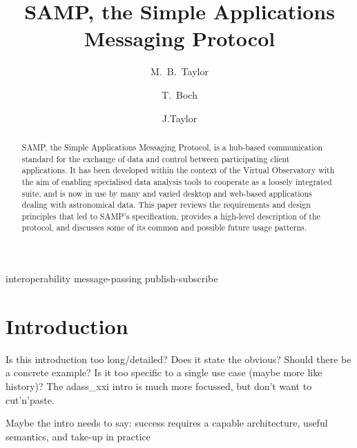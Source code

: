 \documentclass[5p]{elsarticle}
\newcommand{\todo}{\color{gray}}
\begin{document}
\begin{frontmatter}

\title{SAMP, the Simple Applications Messaging Protocol}

\author[bristol]{M.~B.~Taylor}
\author[cds]{T.~Boch}
\author[google]{J.Taylor}

\address[bristol]{H.~H.~Wills Physics Laboratory, University of Bristol, UK}
\address[cds]{CDS, Observatoire Astronomique de Strasbourg, France}
\address[google]{Google, USA}

\begin{abstract}
SAMP, the Simple Applications Messaging Protocol, is a
hub-based communication standard for the exchange of data and control
between participating client applications.
It has been developed within the context of the Virtual Observatory
with the aim of enabling specialised data analysis tools to cooperate
as a loosely integrated suite, and is now in use by many and varied
desktop and web-based applications dealing with astronomical data.
This paper reviews the requirements and design principles that led to
SAMP's specification, provides a high-level description of the protocol,
and discusses some of its common and possible future usage patterns.
\end{abstract}

\begin{keyword}
interoperability
message-passing
publish-subscribe
\end{keyword}

\end{frontmatter}

\begin{flushright}
{\tt }
\end{flushright}

\newcommand{\kdot}{.\linebreak[0]}

\section{Introduction}

{\todo
Is this introduction too long/detailed?
Does it state the obvious?
Should there be a concrete example?
Is it too specific to a single use case (maybe more like history)?
The adass\_xxi intro is much more focussed, but don't want to cut'n'paste.

Maybe the intro needs to say: success requires a capable architecture,
useful semantics, and take-up in practice
}
\end{document}
